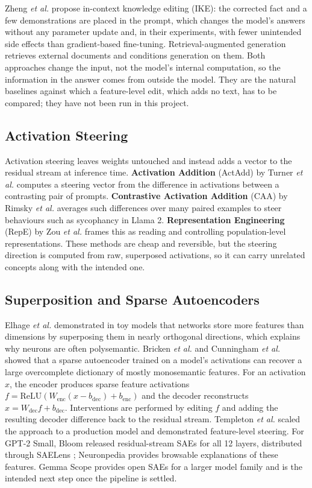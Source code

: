 \documentclass[12pt,a4paper]{report}
\begin{document}
Zheng \textit{et al.} \cite{r31} propose in-context knowledge editing (IKE): the corrected fact and a few demonstrations are placed in the prompt, which changes the model's answers without any parameter update and, in their experiments, with fewer unintended side effects than gradient-based fine-tuning. Retrieval-augmented generation \cite{r34} retrieves external documents and conditions generation on them. Both approaches change the input, not the model's internal computation, so the information in the answer comes from outside the model. They are the natural baselines against which a feature-level edit, which adds no text, has to be compared; they have not been run in this project.

\subsection{Activation Steering}

Activation steering leaves weights untouched and instead adds a vector to the residual stream at inference time. \textbf{Activation Addition} (ActAdd) by Turner \textit{et al.} \cite{r9} computes a steering vector from the difference in activations between a contrasting pair of prompts. \textbf{Contrastive Activation Addition} (CAA) by Rimsky \textit{et al.} \cite{r10} averages such differences over many paired examples to steer behaviours such as sycophancy in Llama 2. \textbf{Representation Engineering} (RepE) by Zou \textit{et al.} \cite{r11} frames this as reading and controlling population-level representations. These methods are cheap and reversible, but the steering direction is computed from raw, superposed activations, so it can carry unrelated concepts along with the intended one.

\subsection{Superposition and Sparse Autoencoders}

Elhage \textit{et al.} \cite{r5} demonstrated in toy models that networks store more features than dimensions by superposing them in nearly orthogonal directions, which explains why neurons are often polysemantic. Bricken \textit{et al.} \cite{r6} and Cunningham \textit{et al.} \cite{r7} showed that a sparse autoencoder trained on a model's activations can recover a large overcomplete dictionary of mostly monosemantic features. For an activation $x$, the encoder produces sparse feature activations $f = \mathrm{ReLU}(W_{\text{enc}}(x - b_{\text{dec}}) + b_{\text{enc}})$ and the decoder reconstructs $\hat{x} = W_{\text{dec}} f + b_{\text{dec}}$. Interventions are performed by editing $f$ and adding the resulting decoder difference back to the residual stream. Templeton \textit{et al.} \cite{r8} scaled the approach to a production model and demonstrated feature-level steering. For GPT-2 Small, Bloom \cite{r15} released residual-stream SAEs for all 12 layers, distributed through SAELens \cite{r14}; Neuronpedia \cite{r20} provides browsable explanations of these features. Gemma Scope \cite{r19} provides open SAEs for a larger model family and is the intended next step once the pipeline is settled.
\end{document}

